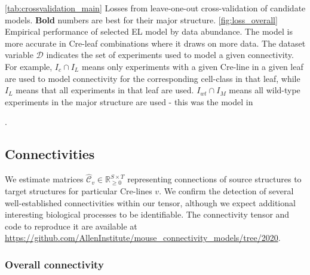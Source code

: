 \begin{table}[H]
{\label{tab:crossvalidation_main}
}
\caption{\ref{tab:crossvalidation_main} Losses from leave-one-out cross-validation of candidate models.
\textbf{Bold} numbers are best for their major structure.
\ref{fig:loss_overall} Empirical performance of selected EL model by data abundance.
The model is more accurate in Cre-leaf combinations where it draws on more data.
The dataset variable $\mathcal D$ indicates the set of experiments used to model a given connectivity.
For example, $I_c \cap I_L$ means only experiments with a given Cre-line in a given leaf are used to model connectivity for the corresponding cell-class in that leaf, while $I_L$ means that all experiments in that leaf are used.
$I_{wt} \cap I_M$ means all wild-type experiments in the major structure are used - this was the model in \citet{Knox2019-ot}}.
\end{table}

\subsection{Connectivities}

We estimate matrices $\hat {\mathcal C}_v \in \mathbb R_{\geq 0}^{S \times T}$ representing connections of source structures to target structures for particular Cre-lines $v$. 
We confirm the detection of several well-established connectivities within our tensor, although we expect additional interesting biological processes to be identifiable.
The connectivity tensor and code to reproduce it are available at \url{https://github.com/AllenInstitute/mouse_connectivity_models/tree/2020}.

\subsubsection{Overall connectivity}

